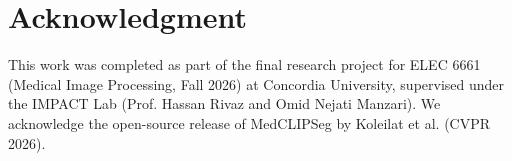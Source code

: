 \documentclass[10pt,journal,compsoc]{IEEEtran}
\begin{document}
\section*{Acknowledgment}
This work was completed as part of the final research project for ELEC 6661 (Medical Image Processing, Fall 2026) at Concordia University, supervised under the IMPACT Lab (Prof. Hassan Rivaz and Omid Nejati Manzari). We acknowledge the open-source release of MedCLIPSeg by Koleilat et al. (CVPR 2026).



\end{document}
